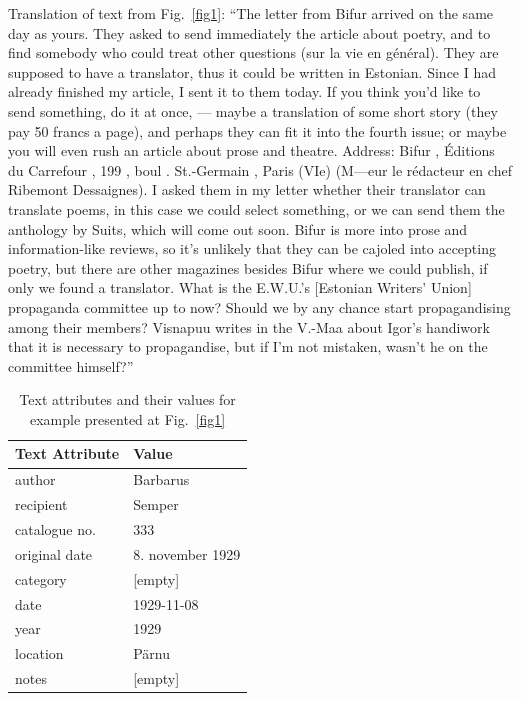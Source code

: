 \documentclass[runningheads]{llncs}
\begin{document}
Translation of text from Fig.~\ref{fig1}:
``The letter from Bifur arrived on the same day as yours. They asked to send immediately the article about poetry, and to find somebody who could treat other questions (sur la vie en g\'en\'eral). They are supposed to have a translator, thus it could be written in Estonian. Since I had already finished my article, I sent it to them today. If you think you’d like to send something, do it at once, --- maybe a translation of some short story (they pay 50 francs a page), and perhaps they can fit it into the fourth issue; or maybe you will even rush an article about prose and theatre. Address: Bifur , \'Editions du Carrefour , 199 , boul . St.-Germain , Paris (VIe) (M---eur le r\'edacteur en chef Ribemont Dessaignes). I asked them in my letter whether their translator can translate poems, in this case we could select something, or we can send them the anthology by Suits, which will come out soon. Bifur is more into prose and information-like reviews, so it’s unlikely that they can be cajoled into accepting poetry, but there are other magazines besides Bifur where we could publish, if only we found a translator. What is the E.W.U.’s [Estonian Writers’ Union] propaganda committee up to now? Should we by any chance start propagandising among their members? Visnapuu writes in the V.-Maa about Igor’s handiwork that it is necessary to propagandise, but if I’m not mistaken, wasn’t he on the committee himself?''

\begin{table}
  \caption{Text attributes and their values for example presented at Fig.~\ref{fig1}}
  \label{tabattrs}
\begin{tabular}{|l | l |}
  \hline
  Text Attribute & Value \\
  \hline

author & Barbarus\\
recipient & Semper\\
catalogue no. & 333\\
original date & 8. november 1929\\
category & [empty]\\
date & 1929-11-08\\
year & 1929\\
location & Pärnu\\
notes & [empty]\\
\hline
\end{tabular}
\end{table}
\end{document}
